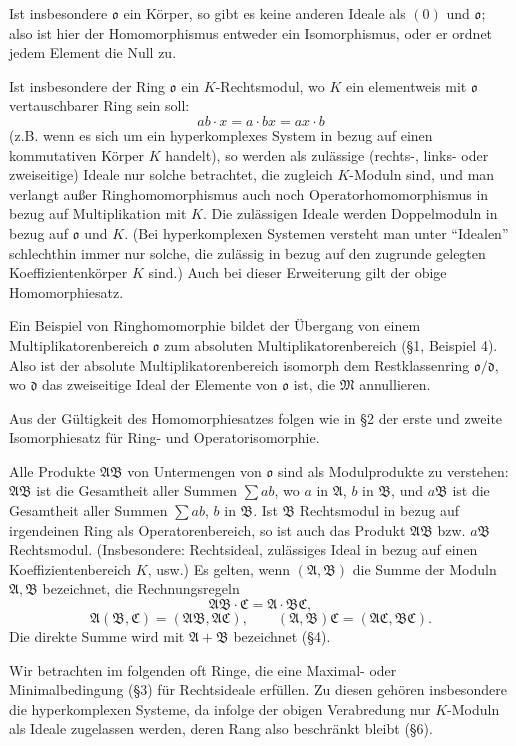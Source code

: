 \documentclass[11pt]{article}
\providecommand{\mA}{\mathfrak{A}}
\providecommand{\mB}{\mathfrak{B}}
\providecommand{\mC}{\mathfrak{C}}
\providecommand{\mM}{\mathfrak{M}}
\providecommand{\mo}{\mathfrak{o}}
\providecommand{\md}{\mathfrak{d}}
\begin{document}
Ist insbesondere $\mo$ ein Körper, so gibt es keine anderen Ideale als $(0)$ und $\mo$; also ist hier der Homomorphismus entweder ein Isomorphismus, oder er ordnet jedem Element die Null zu.

Ist insbesondere der Ring $\mo$ ein $K$-Rechtsmodul, wo $K$ ein elementweis mit $\mo$ vertauschbarer Ring sein soll:
\[
        ab\cdot x=a\cdot bx=ax\cdot b
\]
(z.B. wenn es sich um ein hyperkomplexes System in bezug auf einen kommutativen Körper $K$ handelt), so werden als zulässige (rechts-, links- oder zweiseitige) Ideale nur solche betrachtet, die zugleich $K$-Moduln sind, und man verlangt außer Ringhomomorphismus auch noch Operatorhomomorphismus in bezug auf Multiplikation mit $K$. Die zulässigen Ideale werden Doppelmoduln in bezug auf $\mo$ und $K$. (Bei hyperkomplexen Systemen versteht man unter ``Idealen'' schlechthin immer nur solche, die zulässig in bezug auf den zugrunde gelegten Koeffizientenkörper $K$ sind.) Auch bei dieser Erweiterung gilt der obige Homomorphiesatz.

Ein Beispiel von Ringhomomorphie bildet der Übergang von einem Multiplikatorenbereich $\mo$ zum absoluten Multiplikatorenbereich (§1, Beispiel 4). Also ist der absolute Multiplikatorenbereich isomorph dem Restklassenring $\mo/\md$, wo $\md$ das zweiseitige Ideal der Elemente von $\mo$ ist, die $\mM$ annullieren.

Aus der Gültigkeit des Homomorphiesatzes folgen wie in §2 der erste und zweite Isomorphiesatz für Ring- und Operatorisomorphie.

Alle Produkte $\mA\mB$ von Untermengen von $\mo$ sind als Modulprodukte zu verstehen: $\mA\mB$ ist die Gesamtheit aller Summen $\sum ab$, wo $a$ in $\mA$, $b$ in $\mB$, und $a\mB$ ist die Gesamtheit aller Summen $\sum ab$, $b$ in $\mB$. Ist $\mB$ Rechtsmodul in bezug auf irgendeinen Ring als Operatorenbereich, so ist auch das Produkt $\mA\mB$ bzw. $a\mB$ Rechtsmodul. (Insbesondere: Rechtsideal, zulässiges Ideal in bezug auf einen Koeffizientenbereich $K$, usw.) Es gelten, wenn $(\mA,\mB)$ die Summe der Moduln $\mA,\mB$ bezeichnet, die Rechnungsregeln
\[
        \mA\mB\cdot\mC=\mA\cdot\mB\mC,
\]
\[
        \mA(\mB,\mC)=(\mA\mB,\mA\mC),
        \qquad
        (\mA,\mB)\mC=(\mA\mC,\mB\mC).
\]
Die direkte Summe wird mit $\mA+\mB$ bezeichnet (§4).

Wir betrachten im folgenden oft Ringe, die eine Maximal- oder Minimalbedingung (§3) für Rechtsideale erfüllen. Zu diesen gehören insbesondere die hyperkomplexen Systeme, da infolge der obigen Verabredung nur $K$-Moduln als Ideale zugelassen werden, deren Rang also beschränkt bleibt (§6).
\end{document}

